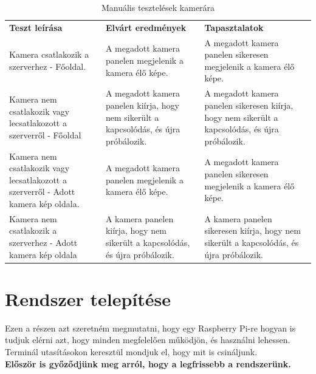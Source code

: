 \documentclass[
]{thesis-ekf}
\theoremstyle{definition}
\theoremstyle{remark}
\begin{document}
\begin{table}
	\begin{tabular}{|p{}|p{}|p{}|}
		\hline
		\rowcolor[HTML]{C0C0C0} 
		{\color[HTML]{333333} \textbf{Teszt leírása}} &
		{\color[HTML]{333333} \textbf{Elvárt eredmények}} &
		{\color[HTML]{333333} \textbf{Tapasztalatok}}
		\\
		\rowcolor[HTML]{EFEFEF} 
		Kamera csatlakozik a szerverhez - Főoldal. &
		
		A megadott kamera panelen megjelenik a kamera élő képe. &
		
		A megadott kamera panelen sikeresen megjelenik a kamera élő képe.
		\\
		Kamera nem csatlakozik vagy lecsatlakozott a szerverről - Főoldal &
		
		A megadott kamera panelen kiírja, hogy nem sikerült a kapcsolódás, és újra próbálozik. &
		
		A megadott kamera panelen sikeresen kiírja, hogy nem sikerült a kapcsolódás, és újra próbálozik.
		\\
		\rowcolor[HTML]{EFEFEF} 
		Kamera nem csatlakozik vagy lecsatlakozott a szerverről - Adott kamera kép oldala. &
		
		A megadott kamera panelen megjelenik a kamera élő képe. &
		
		A megadott kamera panelen sikeresen megjelenik a kamera élő képe.
		\\
		Kamera nem csatlakozik a szerverhez - Adott kamera kép oldala &
		
		A kamera panelen kiírja, hogy nem sikerült a kapcsolódás, és újra próbálozik. &
		
		A kamera panelen sikeresen kiírja, hogy nem sikerült a kapcsolódás, és újra próbálozik.
		\\ \hline
	\end{tabular}
	\caption{Manuális tesztelések kamerára}
	\label{camera-test-table}
\end{table}

	
	\chapter{Rendszer telepítése}
	Ezen a részen azt szeretném megmutatni, hogy egy Raspberry Pi-re hogyan is tudjuk elérni azt, hogy minden megfelelően működjön, és használni lehessen. Terminál utasításokon keresztül mondjuk el, hogy mit is csináljunk.\\
	\textbf{Először is győződjünk meg arról, hogy a legfrissebb a rendszerünk.}
	
\end{document}
